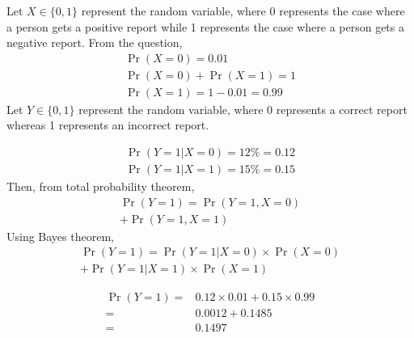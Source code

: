 Let $X \in \{0,1\}$ represent the random variable, where 0 represents the case where a person gets a positive report while 1 represents the case where a person gets a negative report. From the question, 
\begin{align}
    \Pr{(X=0)} = 0.01
    \\\Pr{(X=0)} + \Pr{(X=1)} = 1
    \\\Pr{(X=1)} = 1 - 0.01 = 0.99
\end{align}
Let $Y \in \{0,1\}$ represent the random variable, where 0 represents a correct report whereas 1 represents an incorrect report.

\begin{align}
    \Pr{(Y=1 | X=0)} = 12\% = 0.12
    \\\Pr{(Y=1 | X=1)} = 15\% = 0.15
\end{align}
Then, from total probability theorem,
\begin{multline}
    \Pr{(Y=1)} = \Pr{(Y=1, X=0)} 
    \\+ \Pr{(Y=1, X=1)}
\end{multline}
Using Bayes theorem,
\begin{multline}
    \Pr{(Y=1)} = \Pr{(Y=1 | X=0)} \times \Pr{(X=0)}
    \\ + \Pr{(Y=1 | X=1)} \times \Pr{(X=1)}
\end{multline}
    
\begin{align}
    \Pr{(Y=1)} = & 0.12 \times 0.01 + 0.15 \times 0.99
    \\ = & 0.0012 + 0.1485
    \\ = & 0.1497    
\end{align}